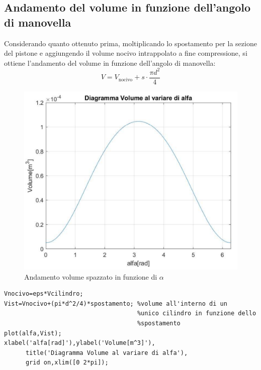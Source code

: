 \subsection{Andamento del volume in funzione dell'angolo di manovella}
Considerando quanto ottenuto prima, moltiplicando lo spostamento per la sezione del pistone e aggiungendo il volume nocivo intrappolato a fine compressione, si ottiene l’andamento del volume in funzione dell’angolo di manovella:
\begin{equation}
    V=V_{\mathrm{nocivo}}+s\cdot\frac{\pi d^2}{4}
\end{equation}
\begin{figure}[h]
    \centering
    \includegraphics[scale=0.5]{Immagini/GraficoVolume.png}
    \caption{Andamento volume spazzato in funzione di $\alpha$}
    \label{fig:GraficoVolume}
\end{figure}
\begin{lstlisting}[frame=trBL]
%Volume cilindro al variare di alfa%
Vnocivo=eps*Vcilindro;
Vist=Vnocivo+(pi*d^2/4)*spostamento; %volume all'interno di un
                                     %unico cilindro in funzione dello 
                                     %spostamento
plot(alfa,Vist);
xlabel('alfa[rad]'),ylabel('Volume[m^3]'),
      title('Diagramma Volume al variare di alfa'),
      grid on,xlim([0 2*pi]);
\end{lstlisting}
